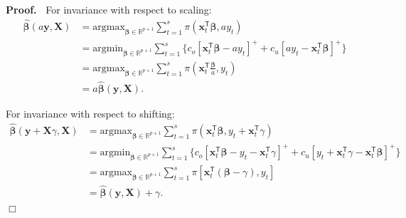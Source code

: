 \documentclass{article}
\newenvironment{proof}
 {\begin{trivlist} \item[] {\bf Proof.\ }}{\hfill$\Box$ \end{trivlist}}
\begin{document}
\begin{proof}
For invariance with respect to scaling:
\[
    \begin{aligned}
        \hat{\boldsymbol{\beta}}(a\mathbf{y},\mathbf{X})
        &=\text{argmax}_{\boldsymbol{\beta}\in \mathbb{R}^{p+1}}\displaystyle\sum_{t=1}^s{\pi(\mathbf{x}_t^{\mathsf{T}}\boldsymbol{\beta},ay_t)}\\
        &=\text{argmin}_{\boldsymbol{\beta}\in \mathbb{R}^{p+1}}\displaystyle\sum_{t=1}^s{\{c_o[\mathbf{x}_t^{\mathsf{T}}\boldsymbol{\beta}-ay_t]^{+}+c_u[ay_t-\mathbf{x}_t^{\mathsf{T}}\boldsymbol{\beta}]^{+}\}}\\
        &=\text{argmax}_{\boldsymbol{\beta}\in \mathbb{R}^{p+1}}\displaystyle\sum_{t=1}^s{\pi\left(\mathbf{x}_t^{\mathsf{T}}\frac{\boldsymbol{\beta}}{a},y_t\right)}\\
        &=a\hat{\boldsymbol{\beta}}(\mathbf{y},\mathbf{X}).
    \end{aligned}
\]

\noindent
For invariance with respect to shifting:
\[
    \begin{aligned}
        \hat{\boldsymbol{\beta}}(\mathbf{y}+\mathbf{X}\gamma,\mathbf{X})
        &=\text{argmax}_{\boldsymbol{\beta}\in \mathbb{R}^{p+1}}\displaystyle\sum_{t=1}^s{\pi(\mathbf{x}_t^{\mathsf{T}}\boldsymbol{\beta},y_t+\mathbf{x}_t^{\mathsf{T}}\gamma)}\\
        &=\text{argmin}_{\boldsymbol{\beta}\in \mathbb{R}^{p+1}}\displaystyle\sum_{t=1}^s{\{c_o[\mathbf{x}_t^{\mathsf{T}}\boldsymbol{\beta}-y_t-\mathbf{x}_t^{\mathsf{T}}\gamma]^{+}+c_u[y_t+\mathbf{x}_t^{\mathsf{T}}\gamma-\mathbf{x}_t^{\mathsf{T}}\boldsymbol{\beta}]^{+}\}}\\
        &=\text{argmax}_{\boldsymbol{\beta}\in \mathbb{R}^{p+1}}\displaystyle\sum_{t=1}^s{\pi[\mathbf{x}_t^{\mathsf{T}}(\boldsymbol{\beta}-\gamma),y_t]}\\
        &=\hat{\boldsymbol{\beta}}(\mathbf{y},\mathbf{X})+\gamma.
    \end{aligned}
\]
\end{proof}
\end{document}

